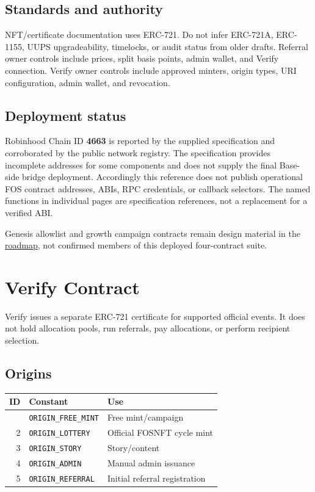 \documentclass[
  10pt,
  letterpaper,
]{article}
\begin{document}
\subsection{Standards and authority}\label{standards-and-authority}

NFT/certificate documentation uses ERC-721. Do not infer ERC-721A,
ERC-1155, UUPS upgradeability, timelocks, or audit status from older
drafts. Referral owner controls include prices, split basis points,
admin wallet, and Verify connection. Verify owner controls include
approved minters, origin types, URI configuration, admin wallet, and
revocation.

\subsection{Deployment status}\label{deployment-status}

Robinhood Chain ID \textbf{4663} is reported by the supplied
specification and corroborated by the public network registry. The
specification provides incomplete addresses for some components and does
not supply the final Base-side bridge deployment. Accordingly this
reference does not publish operational FOS contract addresses, ABIs, RPC
credentials, or callback selectors. The named functions in individual
pages are specification references, not a replacement for a verified
ABI.

Genesis allowlist and growth campaign contracts remain design material
in the \href{https://fos.ooo/document/docs/roadmap}{roadmap}, not
confirmed members of this deployed four-contract suite.

\section{Verify Contract}\label{verify-contract}

Verify issues a separate ERC-721 certificate for supported official
events. It does not hold allocation pools, run referrals, pay
allocations, or perform recipient selection.

\subsection{Origins}\label{origins}

\begin{longtable}[]{@{}rll@{}}
\toprule\noalign{}
ID & Constant & Use \\
\midrule\noalign{}
\endhead
\bottomrule\noalign{}
\endlastfoot
1 & \texttt{ORIGIN\_FREE\_MINT} & Free mint/campaign \\
2 & \texttt{ORIGIN\_LOTTERY} & Official FOSNFT cycle mint \\
3 & \texttt{ORIGIN\_STORY} & Story/content \\
4 & \texttt{ORIGIN\_ADMIN} & Manual admin issuance \\
5 & \texttt{ORIGIN\_REFERRAL} & Initial referral registration \\
\end{longtable}
\end{document}
